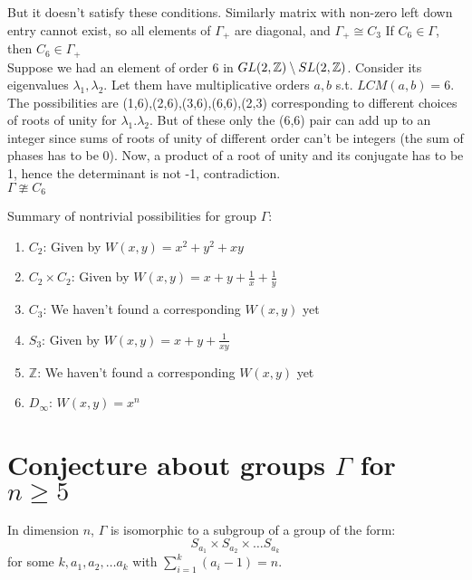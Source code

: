 \documentclass[a4paper]{article}
\begin{document}
    But it doesn't satisfy these conditions.
    Similarly matrix with non-zero left down entry cannot exist, so all elements of $\Gamma_+$ are diagonal, and $\Gamma_+ \cong C_3$
    \clm If $C_6 \in \Gamma$, then $C_6\in \Gamma_+$\\
    Suppose we had an element of order 6 in $GL(2,\mathbb{Z})\setminus SL(2,\mathbb{Z})$. Consider its eigenvalues $\lambda_1,\lambda_2$. Let them have multiplicative orders $a,b$ s.t. $LCM(a,b)=6$. The possibilities are (1,6),(2,6),(3,6),(6,6),(2,3) corresponding to different choices of roots of unity for  $\lambda_1.\lambda_2$. But of these only the (6,6) pair can add up to an integer since sums of roots of unity of different order can't be integers (the sum of phases has to be 0). Now, a product of a root of unity and its conjugate has to be 1, hence the determinant is not -1, contradiction.\\
    
    \cor $\Gamma \ncong C_6$
    
    Summary of nontrivial possibilities for group $\Gamma$:
    \begin{enumerate}
    	\item $C_2$: Given by $W(x,y) = x^2 + y^2+ x y$ 
    	\item $C_2 \times C_2$: Given by $W(x,y) = x+ y +\frac{1}{x}+\frac{1}{y}$
    	\item $C_3$: We haven't found a corresponding $W(x,y)$ yet
    	\item $S_3$: Given by $W(x,y) = x + y +\frac{1}{xy}$
    	\item $\mathbb{Z}$: We haven't found a corresponding $W(x,y)$ yet    
    	\item $D_\infty$: $W(x,y) = x^n$	
    \end{enumerate}
	\section{Conjecture about groups $\Gamma$ for $n \geq 5$}
		In dimension $n$, $\Gamma$ is isomorphic to a subgroup of a group of the form:
		$$S_{a_1} \times S_{a_2} \times \dots S_{a_k}$$ for some $k, a_1, a_2, \dots a_k$ with $\sum_{i=1}^k (a_i - 1) = n$.
\end{document}
